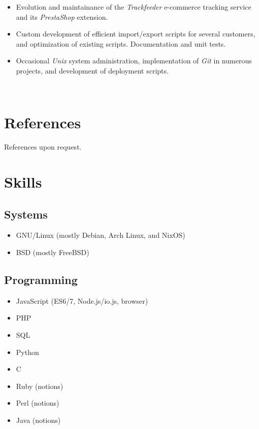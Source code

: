 \documentclass[a4paper]{article}
\begin{document}
\begin{itemize}
  \item Evolution and maintainance of the \textit{Trackfeeder}
  e-commerce tracking service and its \textit{PrestaShop} extension.
  \item Custom development of efficient import/export scripts for
  several customers, and optimization of existing scripts. Documentation
  and unit tests.
  \item Occasional \textit{Unix} system administration, implementation
  of \textit{Git} in numerous projects, and development of deployment
  scripts.

\end{itemize}

~

\section*{References}

References upon request.

\clearpage

\section*{Skills}

\subsection*{Systems}

\begin{itemize}
  \item GNU/Linux (mostly Debian, Arch Linux, and NixOS)
  \item BSD (mostly FreeBSD)
\end{itemize}

\subsection*{Programming}

\begin{itemize}
  \item JavaScript (ES6/7, Node.js/io.js, browser)
  \item PHP
  \item SQL
  \item Python
  \item C
  \item Ruby (notions)
  \item Perl (notions)
  \item Java (notions)
\end{itemize}
\end{document}
